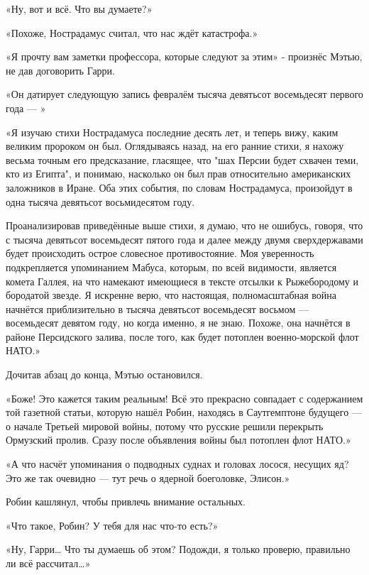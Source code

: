 \documentclass[a4paper,12pt]{book}
\begin{document}
\par
«Ну, вот и всё. Что вы думаете?»
\par
«Похоже, Нострадамус считал, что нас ждёт катастрофа.»
\par
«Я прочту вам заметки профессора, которые следуют за этим» - произнёс Мэтью, не дав договорить Гарри.
\par
«Он датирует следующую запись февралём тысяча девятьсот восемьдесят первого года — »\\
\par
«Я изучаю стихи Нострадамуса последние десять лет, и теперь вижу, каким великим пророком он был. Оглядываясь назад, на его ранние стихи, я нахожу весьма точным его предсказание, гласящее, что "шах Персии будет схвачен теми, кто из Египта", и понимаю, насколько он был прав относительно американских заложников в Иране. Оба этих события, по словам Нострадамуса, произойдут в одна тысяча девятьсот восьмидесятом году.
\par
Проанализировав приведённые выше стихи, я думаю, что не ошибусь, говоря, что с тысяча девятьсот восемьдесят пятого года и далее между двумя сверхдержавами будет происходить острое словесное противостояние. Моя уверенность подкрепляется упоминанием Мабуса, которым, по всей видимости, является комета Галлея, на что намекают имеющиеся в тексте отсылки к Рыжебородому и бородатой звезде. Я искренне верю, что настоящая, полномасштабная война начнётся приблизительно в тысяча девятьсот восемьдесят восьмом — восемьдесят девятом году, но когда именно, я не знаю. Похоже, она начнётся в районе Персидского залива, после того, как будет потоплен военно-морской флот НАТО.»\\
\par
Дочитав абзац до конца, Мэтью остановился.
\par
«Боже! Это кажется таким реальным! Всё это прекрасно совпадает с содержанием той газетной статьи, которую нашёл Робин, находясь в Саутгемптоне будущего — о начале Третьей мировой войны, потому что русские решили перекрыть Ормузский пролив. Сразу после объявления войны был потоплен флот НАТО.»
\par
«А что насчёт упоминания о подводных суднах и головах лосося, несущих яд? Это же так очевидно — тут речь о ядерной боеголовке, Элисон.»
\par
Робин кашлянул, чтобы привлечь внимание остальных.
\par
«Что такое, Робин? У тебя для нас что-то есть?»
\par
«Ну, Гарри… Что ты думаешь об этом? Подожди, я только проверю, правильно ли всё рассчитал…»
\end{document}
